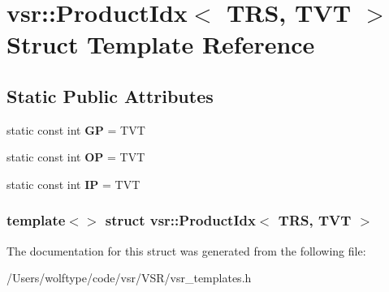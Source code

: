 \hypertarget{structvsr_1_1_product_idx_3_01_t_r_s_00_01_t_v_t_01_4}{\section{vsr\-:\-:Product\-Idx$<$ T\-R\-S, T\-V\-T $>$ Struct Template Reference}
\label{structvsr_1_1_product_idx_3_01_t_r_s_00_01_t_v_t_01_4}
}
\subsection*{Static Public Attributes}
\begin{DoxyCompactItemize}
\item 
\hypertarget{structvsr_1_1_product_idx_3_01_t_r_s_00_01_t_v_t_01_4_a67d3b545ad6a1a83c97ea096f8f16eeb}{static const int {\bfseries G\-P} = T\-V\-T}\label{structvsr_1_1_product_idx_3_01_t_r_s_00_01_t_v_t_01_4_a67d3b545ad6a1a83c97ea096f8f16eeb}

\item 
\hypertarget{structvsr_1_1_product_idx_3_01_t_r_s_00_01_t_v_t_01_4_a679243b8253db296bec1c702cb951ae3}{static const int {\bfseries O\-P} = T\-V\-T}\label{structvsr_1_1_product_idx_3_01_t_r_s_00_01_t_v_t_01_4_a679243b8253db296bec1c702cb951ae3}

\item 
\hypertarget{structvsr_1_1_product_idx_3_01_t_r_s_00_01_t_v_t_01_4_a773ce29a8df3fe6039cb62e81ff29abf}{static const int {\bfseries I\-P} = T\-V\-T}\label{structvsr_1_1_product_idx_3_01_t_r_s_00_01_t_v_t_01_4_a773ce29a8df3fe6039cb62e81ff29abf}

\end{DoxyCompactItemize}
\subsubsection*{template$<$$>$ struct vsr\-::\-Product\-Idx$<$ T\-R\-S, T\-V\-T $>$}



The documentation for this struct was generated from the following file\-:\begin{DoxyCompactItemize}
\item 
/\-Users/wolftype/code/vsr/\-V\-S\-R/vsr\-\_\-templates.\-h\end{DoxyCompactItemize}
